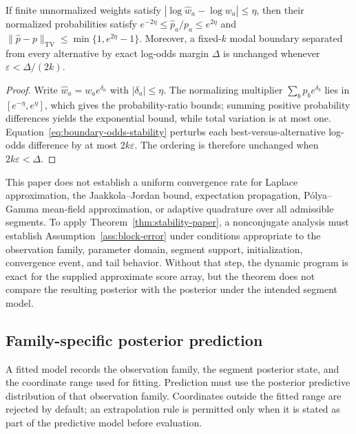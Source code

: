 \begin{corollary}
\label{cor:stability-paper}
If finite unnormalized weights satisfy $|\log\widehat w_a-\log w_a|\le\eta$, then their normalized probabilities satisfy $e^{-2\eta}\le\widehat p_a/p_a\le e^{2\eta}$ and $\|\widehat p-p\|_{\mathrm{TV}}\le\min\{1,e^{2\eta}-1\}$. Moreover, a fixed-$k$ modal boundary separated from every alternative by exact log-odds margin $\Delta$ is unchanged whenever $\varepsilon<\Delta/(2k)$.
\end{corollary}
\begin{proof}
Write $\widehat w_a=w_ae^{\delta_a}$ with $|\delta_a|\le\eta$. The normalizing multiplier $\sum_b p_be^{\delta_b}$ lies in $[e^{-\eta},e^{\eta}]$, which gives the probability-ratio bounds; summing positive probability differences yields the exponential bound, while total variation is at most one. Equation~\eqref{eq:boundary-odds-stability} perturbs each best-versus-alternative log-odds difference by at most $2k\varepsilon$. The ordering is therefore unchanged when $2k\varepsilon<\Delta$.
\end{proof}

\begin{proofobligation}
\label{obl:routine-certification-paper}
This paper does not establish a uniform convergence rate for Laplace approximation, the Jaakkola--Jordan bound, expectation propagation, P\'olya--Gamma mean-field approximation, or adaptive quadrature over all admissible segments. To apply Theorem~\ref{thm:stability-paper}, a nonconjugate analysis must establish Assumption~\ref{ass:block-error} under conditions appropriate to the observation family, parameter domain, segment support, initialization, convergence event, and tail behavior. Without that step, the dynamic program is exact for the supplied approximate score array, but the theorem does not compare the resulting posterior with the posterior under the intended segment model.
\end{proofobligation}

\subsection{Family-specific posterior prediction}
A fitted model records the observation family, the segment posterior state, and the coordinate range used for fitting. Prediction must use the posterior predictive distribution of that observation family. Coordinates outside the fitted range are rejected by default; an extrapolation rule is permitted only when it is stated as part of the predictive model before evaluation.

